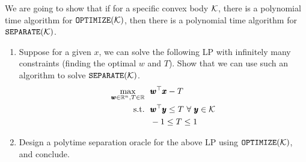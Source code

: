 We are going to show that if for a specific convex body ${\mathcal{K}}$, there is a polynomial time algorithm for $\texttt{OPTIMIZE}({\mathcal{K}})$, then there is a polynomial time algorithm for $\texttt{SEPARATE}({\mathcal{K}})$.
\begin{enumerate}[label = (\alph*)]
\item Suppose for a given $x$, we can solve the following LP with infinitely many constraints (finding the optimal $w$ and $T$). Show that we can use such an algorithm to solve $\texttt{SEPARATE}({\mathcal{K}})$.
\begin{equation}\label{margin}
\begin{aligned}
\max_{\pmb w\in \mathbb{R}^{n},T\in\mathbb{R}} &~~ \pmb w^{\top} \pmb x-T\\
\text{s.t.} &~~ \pmb w^{\top} \pmb y \le T~\forall~ \pmb y\in{\mathcal{K}}\\
&~~ -1\le T\le 1
\end{aligned}
\end{equation}
\item Design a polytime separation oracle for the above LP using $\texttt{OPTIMIZE}({\mathcal{K}})$, and conclude.
\end{enumerate}


\soln

